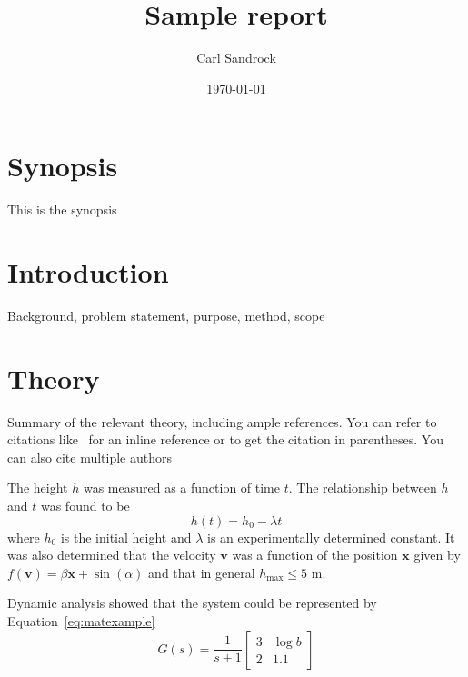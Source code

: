\documentclass[a4paper,12pt]{article}
\title{Sample report}
\author{Carl Sandrock}
\date{\today}
\begin{document}
\maketitle
\makecoverpage

\pagestyle{plain}
\thispagestyle{plain}

\begin{center}
\LARGE\textbf{\thetitle}
\end{center}

\section*{Synopsis}
This is the synopsis

\newpage
\tableofcontents
\newpage
\listoffigures
\newpage
\listoftables
\newpage
\printnomenclature
\newpage

\pagestyle{plain}
\setcounter{page}{1}

\section{Introduction}
Background, problem statement, purpose, method, scope

\section{Theory}
Summary of the relevant theory, including ample references. You can refer to citations like~\citep{bruckmanmandersloot} for an inline reference or \citep{bruckmanmandersloot} to get the citation in parentheses. You can also cite multiple authors~\citep{mandersloot,bruckmanmandersloot}

The height $h$ was measured as a function of time $t$.  The relationship between $h$ and $t$ was found to be 
\begin{equation}
  \label{eq:commaexample}
  h(t) = h_0 - \lambda t
\end{equation}
where $h_0$ is the initial height and $\lambda$ is an experimentally
determined constant.  It was also determined that the velocity
$\mathbf{v}$ was a function of the position $\mathbf{x}$ given by
$f(\mathbf{v}) = \beta \mathbf{x} + \sin(\alpha)$ and that in general
$h_{\mathrm{max}} \leq 5$ m.

Dynamic analysis showed that the system could be represented by
Equation~\ref{eq:matexample}
\begin{equation}
  \label{eq:matexample}
  G(s) = \frac{1}{s+1}\left [ 
    \begin{array}{cc} 
      3 & \log{b} \\ 
      2 & \num{1.1} 
    \end{array} \right ]
\end{equation}
\end{document}
